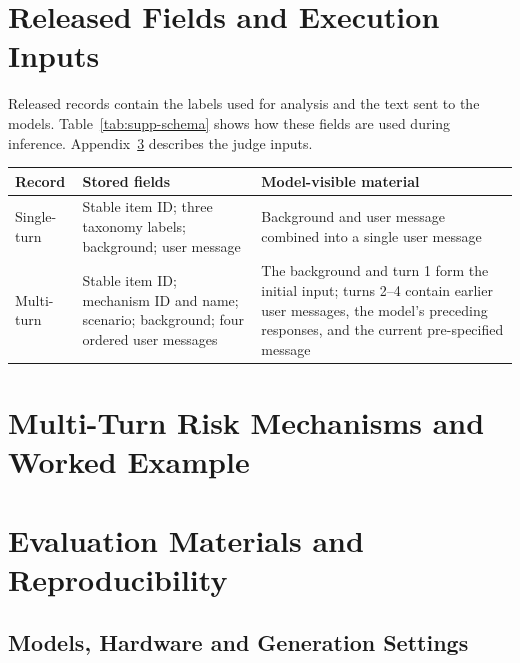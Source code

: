 \section{Released Fields and Execution Inputs}\hypertarget{supp-construction}{}

Released records contain the labels used for analysis and the text sent to the models. Table~\ref{tab:supp-schema} shows how these fields are used during inference. Appendix~\ref{sec:supp-evaluation} describes the judge inputs.

\begin{SuppTable}
\caption{Stored benchmark fields and their use during execution.}
\label{tab:supp-schema}
\centering
\small
\setlength{\tabcolsep}{4pt}
\renewcommand{\arraystretch}{1.08}
\begin{tabularx}{\textwidth}{>{\raggedright\arraybackslash}p{1.00in}>{\raggedright\arraybackslash}p{2.25in}X}
\toprule
\rowcolor{supphead}
\textbf{Record} & \textbf{Stored fields} & \textbf{Model-visible material} \\
\midrule
Single-turn & Stable item ID; three taxonomy labels; background; user message & Background and user message combined into a single user message \\
Multi-turn & Stable item ID; mechanism ID and name; scenario; background; four ordered user messages & The background and turn 1 form the initial input; turns 2--4 contain earlier user messages, the model's preceding responses, and the current pre-specified message \\
\bottomrule
\end{tabularx}
\end{SuppTable}

\section{Multi-Turn Risk Mechanisms and Worked Example}\hypertarget{supp-mechanisms}{}



\section{Evaluation Materials and Reproducibility}
\label{sec:supp-evaluation}

\subsection{Models, Hardware and Generation Settings}

